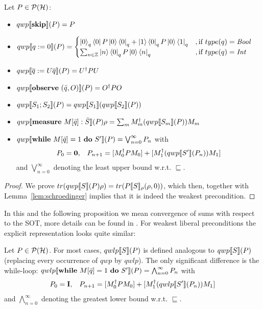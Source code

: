 \documentclass[a4paper,UKenglish,cleveref, autoref, thm-restate]{lipics-v2021}
\begin{document}
\begin{proposition}
    \label{prop:wpDef}
    Let $P \in \mathcal{P}(\mathcal{H})$:
    \begin{itemize}
        \item $qwp\llbracket \mathbf{skip} \rrbracket (P)=P$
        \item $qwp\llbracket q:=0 \rrbracket (P)=
        \begin{cases}
            \ket{0}_q\bra{0}P\ket{0} \bra{0}_q + \ket{1}\bra{0}_q P \ket{0} \bra{1}_q &
         ,\text{if }type(q)=\mathit{Bool} \\
            \sum_{n\in \mathbb{Z}} \ket{n} \bra{0}_q P \ket{0}\bra{n}_q&
        ,\text{if }type(q)=\mathit{Int}
        \end{cases}$
        \item $qwp\llbracket \overline{q}:= U\overline{q} \rrbracket (P)= U^\dagger P U$
        \item $qwp\llbracket \mathbf{observe } \text{ }(\Bar{q},O) \rrbracket (P) = O^\dagger P O$
        \item $qwp\llbracket S_1;S_2 \rrbracket (P)=qwp\llbracket S_1 \rrbracket (qwp\llbracket S_2 \rrbracket (P))$
        \item $qwp\llbracket \mathbf{measure } \text{ }M[\Bar{q}]:\Bar{S} \rrbracket (P)\rho  = \sum_m M_m^\dagger (qwp\llbracket S_m \rrbracket (P)) M_m$
        \item $qwp\llbracket \mathbf{while } \text{ }M[\Bar{q}]=1 \text{ }\mathbf{ do } \text{ }S' \rrbracket (P) = \bigvee_{n=0}^\infty P_n$ with
        \begin{align*}
            P_0  = \mathbf{0}, &&
            P_{n+1} = [M_0^\dagger P  M_0] + [M_1^\dagger(qwp\llbracket S' \rrbracket (P_n)) M_1]
        \end{align*}
        and $\bigvee_{n=0}^\infty$ denoting the least upper bound w.r.t. $\sqsubseteq$.
    \end{itemize}
\end{proposition}
\begin{proof}
    We prove $tr(qwp\llbracket S \rrbracket (P)\rho) = tr(P\llbracket S \rrbracket_{\rho}(\rho,0))$, which then, together with Lemma~\ref{lem:schroedinger} implies that it is indeed the weakest precondition.
\end{proof}
In this and the following proposition we mean convergence of sums with respect to the SOT, more details can be found in \cite{heisenbergdualityUnruh}.
For weakest liberal preconditions the explicit representation looks quite similar:
\begin{proposition}
    \label{prop:wlpDef}
    Let $P \in \mathcal{P}(\mathcal{H})$. For most cases, $qwlp\llbracket S \rrbracket (P)$ is defined analogous to $qwp\llbracket S \rrbracket (P)$ (replacing every occurrence of $qwp$ by $qwlp$). The only significant difference is the while-loop:
    $qwlp\llbracket \mathbf{while } \text{ }M[\Bar{q}]=1 \text{ }\mathbf{ do } \text{ }S' \rrbracket (P) = \bigwedge_{n=0}^\infty P_n$ with
        \begin{align*}
            P_0  =\textbf{I}, &&
            P_{n+1} = [M_0^\dagger P  M_0] + [M_1^\dagger(qwlp\llbracket S' \rrbracket (P_n)) M_1]
        \end{align*}
        and $\bigwedge_{n=0}^\infty$ denoting the greatest lower bound w.r.t. $\sqsubseteq$.
\end{proposition}
\end{document}
